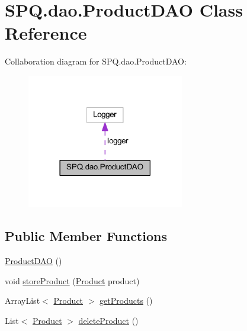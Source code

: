 \hypertarget{class_s_p_q_1_1dao_1_1_product_d_a_o}{}\section{S\+P\+Q.\+dao.\+Product\+D\+AO Class Reference}
\label{class_s_p_q_1_1dao_1_1_product_d_a_o}


Collaboration diagram for S\+P\+Q.\+dao.\+Product\+D\+AO\+:
\nopagebreak
\begin{figure}[H]
\begin{center}
\leavevmode
\includegraphics[width=194pt]{class_s_p_q_1_1dao_1_1_product_d_a_o__coll__graph}
\end{center}
\end{figure}
\subsection*{Public Member Functions}
\begin{DoxyCompactItemize}
\item 
\mbox{\hyperlink{class_s_p_q_1_1dao_1_1_product_d_a_o_a16f6ce4efaca2c8d52d9af93d7cb6d1c}{Product\+D\+AO}} ()
\item 
void \mbox{\hyperlink{class_s_p_q_1_1dao_1_1_product_d_a_o_ae890d625011f3c28730259820c9f4f3c}{store\+Product}} (\mbox{\hyperlink{class_s_p_q_1_1data_1_1_product}{Product}} product)
\item 
Array\+List$<$ \mbox{\hyperlink{class_s_p_q_1_1data_1_1_product}{Product}} $>$ \mbox{\hyperlink{class_s_p_q_1_1dao_1_1_product_d_a_o_addd0016628e2b0db06969de5a944eace}{get\+Products}} ()
\item 
List$<$ \mbox{\hyperlink{class_s_p_q_1_1data_1_1_product}{Product}} $>$ \mbox{\hyperlink{class_s_p_q_1_1dao_1_1_product_d_a_o_acdc252858b17b13fe9677aa1a455bef3}{delete\+Product}} ()
\end{DoxyCompactItemize}


